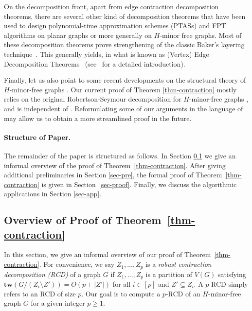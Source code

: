 \documentclass[a4paper,11pt]{article}
\numberwithin{lemma}{section}
\newcommand{\tw}{\mathbf{tw}}
\begin{document}
On the decomposition front, apart from edge contraction decomposition theorems, there are several other kind of decomposition theorems that have been used to design polynomial-time approximation schemes (PTASs) and FPT algorithms on planar graphs or more generally on $H$-minor free graphs.
Most of these decomposition theorems prove strengthening of the classic Baker's layering technique~\cite{Baker94}.
This generally yields, in what is known as (Vertex) Edge Decomposition Theorems~\cite{Baker94,DemaineHK05,DeVosDOSRSV04,Dvorak18,Eppstein00} (see~\cite{Panolan0Z19} for a detailed introduction).

Finally, let us also point to some recent developments on the structural theory of $H$-minor-free graphs \cite{KawarabayashiTW20,ThilikosW23}.
Our current proof of Theorem \ref{thm-contraction} mostly relies on the original Robertson-Seymour decomposition for $H$-minor-free graphs \cite{RobertsonS03a}, and is independent of \cite{KawarabayashiTW20,ThilikosW23}.
Reformulating some of our arguments in the language of \cite{KawarabayashiTW20,ThilikosW23} may allow us to obtain a more streamlined proof in the future.



\paragraph{Structure of Paper.}
The remainder of the paper is structured as follows.
In Section \ref{sec-overview} we give an informal overview of the proof of Theorem~\ref{thm-contraction}.
After giving additional preliminaries in Section \ref{sec-pre}, the formal proof of Theorem~\ref{thm-contraction} is given in Section~\ref{sec-proof}.
Finally, we discuss the algorithmic applications in Section \ref{sec-app}.


\subsection{Overview of Proof of Theorem~\ref{thm-contraction}}
\label{sec-overview}

In this section, we give an informal overview of our proof of Theorem~\ref{thm-contraction}.
For convenience, we say $Z_1,\dots,Z_p$ is a \emph{robust contraction decomposition (RCD)} of a graph $G$ if $Z_1,\dots,Z_p$ is a partition of $V(G)$ satisfying $\tw(G/(Z_i \setminus Z')) = O(p+|Z'|)$ for all $i \in [p]$ and $Z' \subseteq Z_i$.
A $p$-RCD simply refers to an RCD of size $p$.
Our goal is to compute a $p$-RCD of an $H$-minor-free graph $G$ for a given integer $p \geq 1$.
\end{document}
